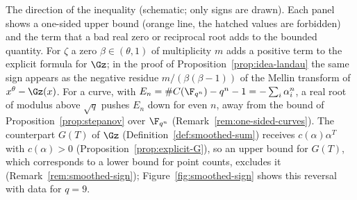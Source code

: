 \caption{The direction of the inequality (schematic; only signs are
drawn). Each panel shows a one-sided upper bound (orange line, the
hatched values are forbidden) and the term that a bad real zero or
reciprocal root adds to the bounded quantity. For $\zeta$ a zero
$\beta\in(\theta,1)$ of multiplicity $m$ adds a positive term to the
explicit formula for $\Gz$; in the proof of
Proposition~\ref{prop:idea-landau} the same sign appears as the
negative residue $m/(\beta(\beta-1))$ of the Mellin transform of
$x^\theta-\Gz(x)$. For a curve, with $E_n=\#C(\F_{q^n})-q^n-1
=-\sum_i\alpha_i^n$, a real root of modulus above $\sqrt q$ pushes
$E_n$ down for even $n$, away from the bound of
Proposition~\ref{prop:stepanov} over $\F_{q^n}$
(Remark~\ref{rem:one-sided-curves}). The counterpart $G(T)$ of $\Gz$
(Definition~\ref{def:smoothed-sum}) receives $c(\alpha)\alpha^T$ with
$c(\alpha)>0$ (Proposition~\ref{prop:explicit-G}), so an upper bound
for $G(T)$, which corresponds to a lower bound for point counts,
excludes it (Remark~\ref{rem:smoothed-sign});
Figure~\ref{fig:smoothed-sign} shows this reversal with data for
$q=9$.}
\label{fig:sign-direction}
